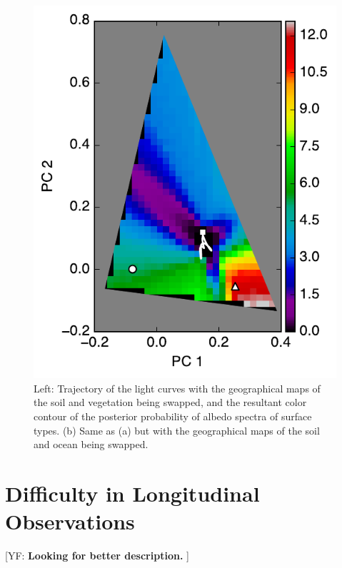 \documentclass[iop,numberedappendix,apj,]{emulateapj}
\def\memoYF#1{\color{red}[YF: {\bf #1}]\color{black}}
\begin{document}
\begin{figure}[tbh!]
\begin{center}
\begin{minipage}{0.33\hsize}
\includegraphics[width=\hsize]{mockdata_90deg_3types3_t360_lc_noreg.pdf}
     \end{minipage}
    \end{center}
    \caption{Left: Trajectory of the light curves with the geographical maps of the soil and vegetation being swapped, and the resultant color contour of the posterior probability of albedo spectra of surface types. (b) Same as (a) but with the geographical maps of the soil and ocean being swapped. }
\label{fig:swap}
\end{figure}


\section{Difficulty in Longitudinal Observations}

\memoYF{Looking for better description. }
\end{document}
